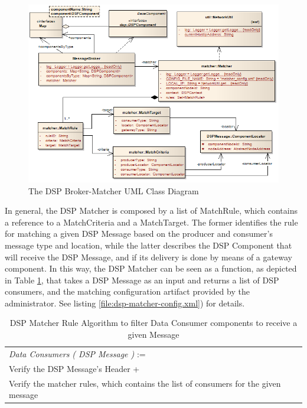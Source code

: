 \begin{figure}[!b]
  \centering
  \includegraphics[scale=0.6]{../diagrams/DSPBroker-Matcher-Class-Diagram}
  \caption{The DSP Broker-Matcher UML Class Diagram}
  \label{fig:DSPBroker-Matcher-Class-Diagram}
\end{figure}

In general, the DSP Matcher is composed by a list of MatchRule, which contains
a reference to a MatchCriteria and a MatchTarget. The former identifies the
rule for matching a given DSP Message based on the producer and consumer's
message type and location, while the latter describes the DSP Component that
will receive the DSP Message, and if its delivery is done by means of a gateway
component. In this way, the DSP Matcher can be seen as a function, as depicted
in Table \ref{tab:matching-rule}, that takes a DSP Message as an input and
returns a list of DSP consumers, and the matching configuration artifact
provided by the administrator. See listing \ref{file:dsp-matcher-config.xml}) for details.

\begin{table}
    \caption{DSP Matcher Rule Algorithm to filter Data Consumer components to
    receive a given Message}
    \begin{center}
        \begin{tabular}{lr}
          \textit{Data Consumers ( DSP Message )} := \\ 
          Verify the DSP Message's Header + \\
          Verify the matcher rules, which contains the list of consumers for
          the given message
        \end{tabular}
    \end{center}
    \label{tab:matching-rule}
\end{table}

